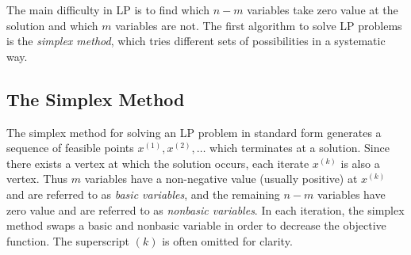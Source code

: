 The main difficulty in LP is to find which $n-m$ variables take zero value at the solution and which $m$ variables are not. The first algorithm to solve LP problems is the {\em simplex method}, which tries different sets of possibilities in a systematic way.

\subsection{The Simplex Method}

The simplex method for solving an LP problem in standard form generates a sequence of feasible points $x^{(1)}, x^{(2)},\ldots$ which terminates at a solution. Since there exists a vertex at which the solution occurs, each iterate $x^{(k)}$ is also a vertex. Thus $m$ variables have a non-negative value (usually positive) at $x^{(k)}$ and are referred to as {\em basic variables}, and the remaining $n-m$ variables have zero value and are referred to as {\em nonbasic variables}. In each iteration, the simplex method swaps a basic and nonbasic variable in order to decrease the objective function. The superscript $(k)$ is often omitted for clarity.

